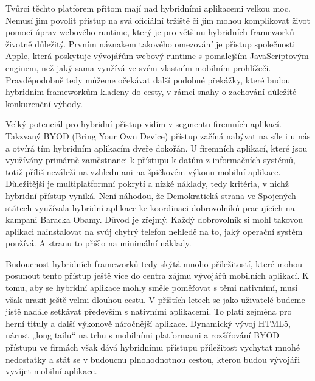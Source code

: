 Tvůrci těchto platforem přitom mají nad hybridními aplikacemi velkou moc. Nemusí jim povolit přístup na svá oficiální tržiště či jim mohou komplikovat život pomocí úprav webového runtime, který je pro většinu hybridních frameworků životně důležitý. Prvním náznakem takového omezování je přístup společnosti Apple, která poskytuje vývojářům webový runtime s pomalejším JavaScriptovým enginem, než jaký sama využívá ve svém vlastním mobilním prohlížeči. Pravděpodobně tedy můžeme očekávat další podobné překážky, které budou hybridním frameworkům kladeny do cesty, v rámci snahy o zachování důležité konkurenční výhody.


Velký potenciál pro hybridní přístup vidím v segmentu firemních aplikací. Takzvaný BYOD (Bring Your Own Device) přístup začíná nabývat na síle i u nás a otvírá tím hybridním aplikacím dveře dokořán. U firemních aplikací, které jsou využívány primárně zaměstnanci k přístupu k datům z informačních systémů, totiž příliš nezáleží na vzhledu ani na špičkovém výkonu mobilní aplikace. Důležitější je multiplatformní pokrytí a nízké náklady, tedy kritéria, v nichž hybridní přístup vyniká. Není náhodou, že Demokratická strana ve Spojených státech využívala hybridní aplikace ke koordinaci dobrovolníků pracujících na kampani Baracka Obamy. Důvod je zřejmý. Každý dobrovolník si mohl takovou aplikaci nainstalovat na svůj chytrý telefon nehledě na to, jaký operační systém používá. A stranu to přišlo na minimální náklady.


Budoucnost hybridních frameworků tedy skýtá mnoho příležitostí, které mohou posunout tento přístup ještě více do centra zájmu vývojářů mobilních aplikací. K tomu, aby se hybridní aplikace mohly směle poměřovat s těmi nativnímí, musí však urazit ještě velmi dlouhou cestu. V příštích letech se jako uživatelé budeme jistě nadále setkávat především s nativními aplikacemi. To platí zejména pro herní tituly a další výkonově náročnější aplikace. Dynamický vývoj HTML5, nárust „long tailu“ na trhu s mobilními platformami a rozšířování BYOD přístupu ve firmách však dává hybridnímu přístupu příležitost vychytat mnohé nedostatky a stát se v budoucnu plnohodnotnou cestou, kterou budou vývojáři vyvíjet mobilní aplikace.